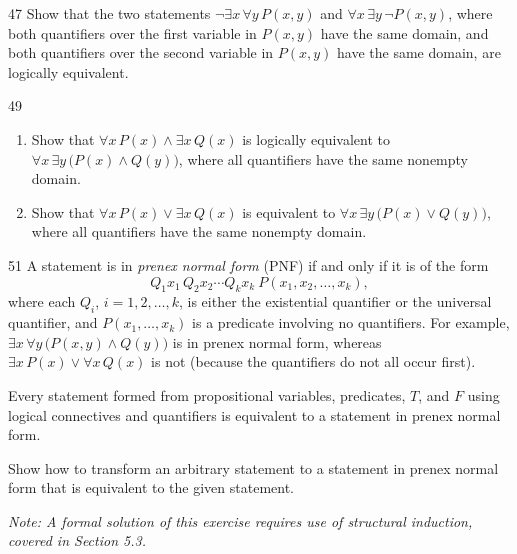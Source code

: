 \documentclass[11pt]{article}
\begin{document}
\begin{exercise}{47}
    Show that the two statements $\neg\exists x\,\forall y\,P(x,y)$
    and $\forall x\,\exists y\,\neg P(x,y)$, where both quantifiers
    over the first variable in $P(x,y)$ have the same domain, and
    both quantifiers over the second variable in $P(x,y)$ have the
    same domain, are logically equivalent.
\end{exercise}

\begin{exercise}{49}
    \begin{enumerate}[label=(\alph*)]
        \item Show that $\forall x\,P(x)\wedge\exists x\,Q(x)$ is
        logically equivalent to $\forall x\,\exists y\,\big(P(x)\wedge Q(y)\big)$,
        where all quantifiers have the same nonempty domain.
        \item Show that $\forall x\,P(x)\vee\exists x\,Q(x)$ is
        equivalent to $\forall x\,\exists y\,\big(P(x)\vee Q(y)\big)$,
        where all quantifiers have the same nonempty domain.
    \end{enumerate}
\end{exercise}

\begin{exercise}{51}
    A statement is in \emph{prenex normal form} (PNF) if and only if
    it is of the form
    \[
    Q_1x_1\,Q_2x_2\cdots Q_kx_k\ P(x_1,x_2,\dots,x_k),
    \]
    where each $Q_i$, $i=1,2,\dots,k$, is either the existential
    quantifier or the universal quantifier, and $P(x_1,\dots,x_k)$ is
    a predicate involving no quantifiers. For example,
    $\exists x\,\forall y\,\big(P(x,y)\wedge Q(y)\big)$ is in prenex
    normal form, whereas $\exists x\,P(x)\vee\forall x\,Q(x)$ is not
    (because the quantifiers do not all occur first).

    Every statement formed from propositional variables, predicates,
    $T$, and $F$ using logical connectives and quantifiers is
    equivalent to a statement in prenex normal form.

    Show how to transform an arbitrary statement to a statement in
    prenex normal form that is equivalent to the given statement.

    \textit{Note: A formal solution of this exercise requires use of
    structural induction, covered in Section 5.3.}
\end{exercise}
\end{document}
